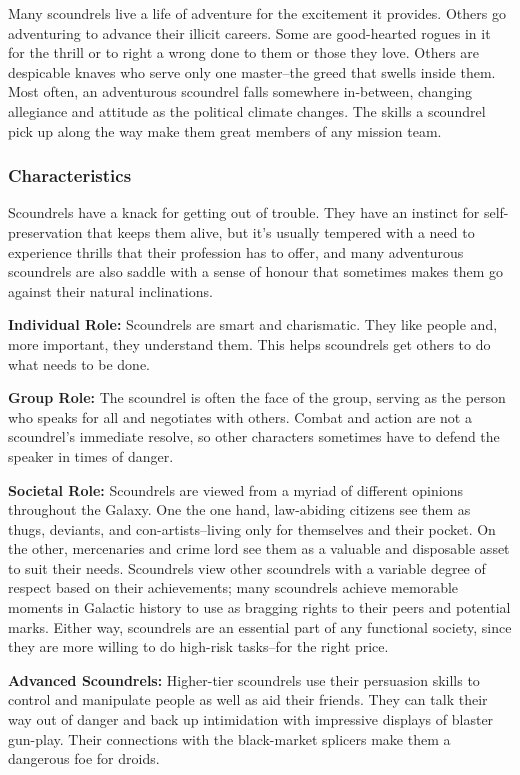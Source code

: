 \documentclass[a4paper,10pt,final,twocolumn,oneside]{book}
\newcommand{\itemLine}[2]{\textbf{#1:}{ #2}\par}
\begin{document}
Many scoundrels live a life of adventure for the excitement it provides. Others go adventuring to advance their illicit careers. Some are good-hearted rogues in it for the thrill or to right a wrong done to them or those they love. Others are despicable knaves who serve only one master--the greed that swells inside them. Most often, an adventurous scoundrel falls somewhere in-between, changing allegiance and attitude as the political climate changes. The skills a scoundrel pick up along the way make them great members of any mission team.

\subsubsection*{Characteristics}
\label{subsub:scoundrelCharacteristics}

Scoundrels have a knack for getting out of trouble. They have an instinct for self-preservation that keeps them alive, but it's usually tempered with a need to experience thrills that their profession has to offer, and many adventurous scoundrels are also saddle with a sense of honour that sometimes makes them go against their natural inclinations.

\itemLine{Individual Role}{Scoundrels are smart and charismatic. They like people and, more important, they understand them. This helps scoundrels get others to do what needs
to be done.}

\itemLine{Group Role}{The scoundrel is often the face of the group, serving as the person who speaks for all and negotiates with others. Combat and action are not a scoundrel's immediate resolve, so other characters sometimes have to defend the speaker in times of danger.}

\itemLine{Societal Role}{Scoundrels are viewed from a myriad of different opinions throughout the Galaxy. One the one hand, law-abiding citizens see them as thugs, deviants, and con-artists--living only for themselves and their pocket. On the other, mercenaries and crime lord see them as a valuable and disposable asset to suit their needs. Scoundrels view other scoundrels with a variable degree of respect based on their achievements; many scoundrels achieve memorable moments in Galactic history to use as bragging rights to their peers and potential marks. Either way, scoundrels are an essential part of any functional society, since they are more willing to do high-risk tasks--for the right price.}

\itemLine{Advanced Scoundrels}{Higher-tier scoundrels use their persuasion skills to control and manipulate people as well as aid their friends. They can talk their way out of danger and back up intimidation with impressive displays of blaster gun-play. Their connections with the black-market splicers make them a dangerous foe for droids.}
\end{document}
